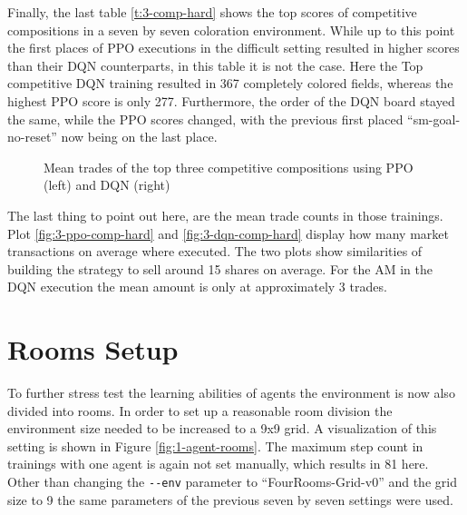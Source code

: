 Finally, the last table \ref{t:3-comp-hard} shows the top scores of competitive compositions in a seven by seven coloration environment. While up to this point the first places of PPO executions in the difficult setting resulted in higher scores than their DQN counterparts, in this table it is not the case. Here the Top competitive DQN training resulted in 367 completely colored fields, whereas the highest PPO score is only 277. Furthermore, the order of the DQN board stayed the same, while the PPO scores changed, with the previous first placed ``sm-goal-no-reset'' now being on the last place. 

\begin{figure}[hpbt]
    \centering
    \hspace{0.01\textwidth}
    \caption[Mean Trades of the Top Competitive Modes in a 7x7 Environment]{Mean trades of the top three competitive compositions using PPO (left) and DQN (right)}
    \label{fig:multipic_plots_comp_hard} 
\end{figure}

The last thing to point out here, are the mean trade counts in those trainings. Plot \ref{fig:3-ppo-comp-hard} and \ref{fig:3-dqn-comp-hard} display how many market transactions on average where executed. The two plots show similarities of building the strategy to sell around 15 shares on average. For the AM in the DQN execution the mean amount is only at approximately 3 trades.

\section{Rooms Setup}\label{room_env}
To further stress test the learning abilities of agents the environment is now also divided into rooms. In order to set up a reasonable room division the environment size needed to be increased to a 9x9 grid. A visualization of this setting is shown in Figure \ref{fig:1-agent-rooms}. The maximum step count in trainings with one agent is again not set manually, which results in 81 here. Other than changing the \verb|--env| parameter to ``FourRooms-Grid-v0'' and the grid size to 9 the same parameters of the previous seven by seven settings were used. \\

